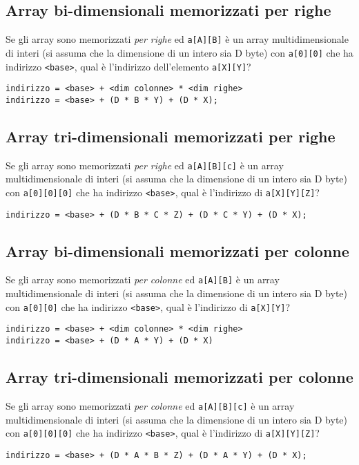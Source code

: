 \documentclass{article}
\begin{document}
\subsection*{Array bi-dimensionali memorizzati per righe}

Se gli array sono memorizzati \emph{per righe} ed \texttt{a[A][B]} è un array multidimensionale di interi (si assuma che la dimensione di un intero sia D byte) con \texttt{a[0][0]} che ha indirizzo \texttt{<base>}, qual è l’indirizzo dell'elemento \texttt{a[X][Y]}?

\begin{lstlisting}
indirizzo = <base> + <dim colonne> * <dim righe>
indirizzo = <base> + (D * B * Y) + (D * X);
\end{lstlisting}

\subsection*{Array tri-dimensionali memorizzati per righe}

Se gli array sono memorizzati \emph{per righe} ed \texttt{a[A][B][c]} è un array multidimensionale di interi (si assuma che la dimensione di un intero sia D byte) con \texttt{a[0][0][0]} che ha indirizzo \texttt{<base>}, qual è l’indirizzo di \texttt{a[X][Y][Z]}?

\begin{lstlisting}
indirizzo = <base> + (D * B * C * Z) + (D * C * Y) + (D * X);
\end{lstlisting}

\subsection*{Array bi-dimensionali memorizzati per colonne}

Se gli array sono memorizzati \emph{per colonne} ed \texttt{a[A][B]} è un array multidimensionale di interi (si assuma che la dimensione di un intero sia D byte) con \texttt{a[0][0]} che ha indirizzo \texttt{<base>}, qual è l’indirizzo di \texttt{a[X][Y]}?

\begin{lstlisting}
indirizzo = <base> + <dim colonne> * <dim righe>
indirizzo = <base> + (D * A * Y) + (D * X)
\end{lstlisting}

\subsection*{Array tri-dimensionali memorizzati per colonne}

Se gli array sono memorizzati \emph{per colonne} ed \texttt{a[A][B][c]} è un array multidimensionale di interi (si assuma che la dimensione di un intero sia D byte) con \texttt{a[0][0][0]} che ha indirizzo \texttt{<base>}, qual è l’indirizzo di \texttt{a[X][Y][Z]}?

\begin{lstlisting}
indirizzo = <base> + (D * A * B * Z) + (D * A * Y) + (D * X);
\end{lstlisting}
\end{document}
